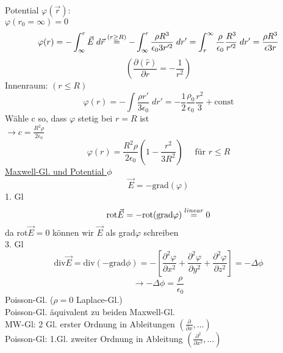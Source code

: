 \documentclass[titlepage,12pt,a4paper,ngerman]{report}
\begin{document}
\noindent
Potential $\varphi(\vec{r})$:\\
$\varphi(r_0 = \infty) = 0$\\
$$\varphi(r) = -\int_\infty ^r \vec{E}\; d\vec{r} \buildrel (r\ge R) \over = -\int_\infty ^r \frac{\rho R^3}{\epsilon_0 3 r'^2}\; dr' =   \int_{r}^{\infty} \frac{\rho}{\epsilon_0} \frac{R^3}{r'^2}\; d r' = \frac{\rho R^3}{\epsilon 3 r}$$
$$(\frac{\partial (\hat{r})}{\partial r} = - \frac{1}{r^2})$$
Innenraum: $(r\le R)$
$$\varphi (r) = -\int \frac{\rho r'}{3 \epsilon_0 } \; dr' = -\frac{1}{2} \frac{\rho_0}{\epsilon_0} \frac{r^2}{3} + \textrm{const}$$
Wähle c so, dass $\varphi$ stetig bei $r = R$ ist\\
$\rightarrow c = \frac{R^2 \rho}{2 \epsilon_0}$
$$\varphi(r) = \frac{R^2 \rho}{2 \epsilon_0} (1 - \frac{r^2}{3 R^2} ) \quad \textrm{ für } r\le R$$
\noindent
\underline{Maxwell-Gl. und Potential $\phi$}
$$\vec{E} = -\textrm{grad}(\varphi)$$
1. Gl $$\textrm{rot}\vec{E} = - \textrm{rot}(\textrm{grad} \varphi )\buildrel linear \over = 0$$
da rot$\vec{E} = 0$ können wir $\vec{E}$ als grad$\varphi$ schreiben\\
3. Gl $$\textrm{div}\vec{E} = \textrm{div}(-\textrm{grad} \phi) = -[\frac{\partial^2 \varphi}{\partial x^2} + \frac{\partial^2 \varphi}{\partial y^2} + \frac{\partial^2 \varphi}{\partial z^2} ] = - \Delta \phi$$
$$\rightarrow -\Delta \phi = \frac{\rho}{\epsilon_0}$$ 
Poisson-Gl. ($\rho = 0$ Laplace-Gl.)\\
Poisson-Gl. äquivalent zu beiden Maxwell-Gl.\\
MW-Gl: 2 Gl. erster Ordnung in Ableitungen $(\frac{\partial}{\partial x} ,\dots )$\\
Poisson-Gl: 1.Gl. zweiter Ordnung in Ableitung $(\frac{\partial^2}{\partial x^2} , \dots )$\\
\end{document}
